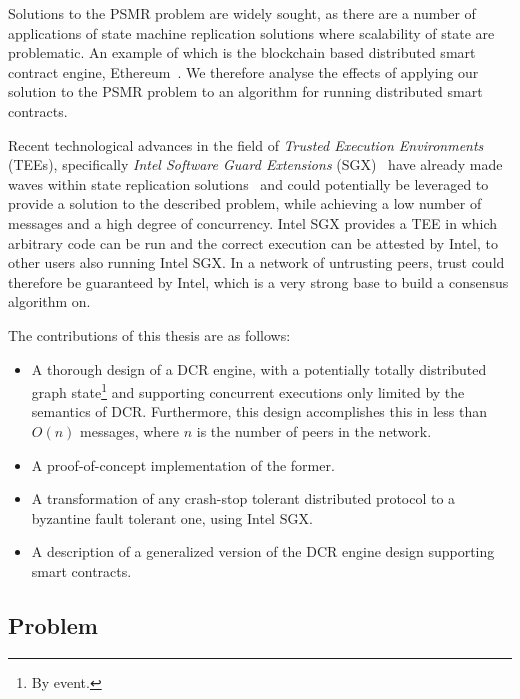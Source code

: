 \documentclass{article}
\begin{document}
	Solutions to the PSMR problem are widely sought, as there are a number of applications of state machine replication solutions where scalability of state are problematic.
	An example of which is the blockchain based distributed smart contract engine, Ethereum~\cite{_ethereum_2018}.
	We therefore analyse the effects of applying our solution to the PSMR problem to an algorithm for running distributed smart contracts.

	Recent technological advances in the field of \textit{Trusted Execution Environments} (TEEs), specifically \textit{Intel Software Guard Extensions} (SGX)~\cite{costan_intel_2016} have already made waves within state replication solutions~\cite{kapitza_cheapbft_2012,veronese_efficient_2013,liu_scalable_2016} and could potentially be leveraged to provide a solution to the described problem, while achieving a low number of messages and a high degree of concurrency.
	Intel SGX provides a TEE in which arbitrary code can be run and the correct execution can be attested by Intel, to other users also running Intel SGX.
	In a network of untrusting peers, trust could therefore be guaranteed by Intel, which is a very strong base to build a consensus algorithm on.

	\noindent The contributions of this thesis are as follows:
	\begin{itemize}
		\item A thorough design of a DCR engine, with a potentially totally distributed graph state\footnote{By event.} and supporting concurrent executions only limited by the semantics of DCR.
		Furthermore, this design accomplishes this in less than $O(n)$ messages, where $n$ is the number of peers in the network.
		\item A proof-of-concept implementation of the former.
		\item A transformation of any crash-stop tolerant distributed protocol to a byzantine fault tolerant one, using Intel SGX.
		\item A description of a generalized version of the DCR engine design supporting smart contracts.
	\end{itemize}

	\subsection{Problem}
\end{document}

